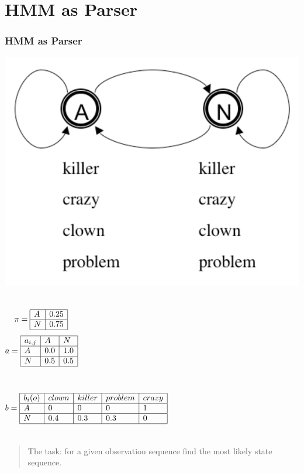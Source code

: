 \section{HMM as Parser}

\begin{frame}
\frametitle{HMM as Parser}
\begin{center}
\includegraphics[scale=.25]{figures/hmmfig2}
\end{center}
{\color{blue}
\begin{center}
\begin{columns}[c]
\column{0.5in}
\[ \pi = \begin{array}{|l|l|}
\hline
A & 0.25 \\ \hline
N & 0.75 \\ \hline
\end{array}
\]
\pause
\column{0.65in}
\[ a = \begin{array}{|l|l|l|}
\hline
a_{i,j} & A & N \\ \hline
A & 0.0 & 1.0 \\ \hline
N & 0.5 & 0.5 \\ \hline
\end{array}
\]
\end{columns}
\pause
\begin{columns}[c]
\column{3in}
\[ b = \begin{array}{|l|l|l|l|l|}
\hline
b_i(o) & clown & killer & problem & crazy \\ \hline
A & 0 & 0 & 0 & 1 \\ \hline
N & 0.4 & 0.3 & 0.3 & 0 \\ \hline
\end{array}
\]
\end{columns}
\end{center}
}
\pause
\begin{quote}
The task: for a given observation sequence find the most likely state sequence.
\end{quote}
\end{frame}

